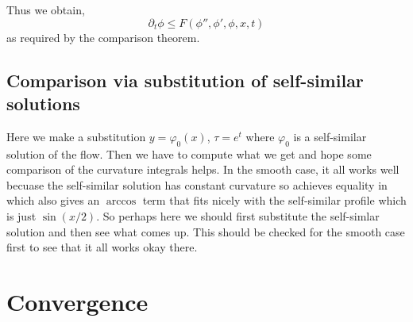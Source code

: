 \documentclass[11pt]{amsart}
\begin{document}
Thus we obtain,
\[
\partial_t \phi \leq F(\phi'', \phi', \phi, x, t)
\]
as required by the comparison theorem.

\subsection{Comparison via substitution of self-similar solutions}

Here we make a substitution $y = \varphi_0 (x)$, $\tau = e^t$ where $\varphi_0$ is a self-similar solution of the flow. Then we have to compute what we get and hope some comparison of the curvature integrals helps. In the smooth case, it all works well becuase the self-similar solution has constant curvature so achieves equality in \holder{} which also gives an $\arccos$ term that fits nicely with the self-similar profile which is just $\sin(x/2)$. So perhaps here we should first substitute the self-simlar solution and then see what comes up. This should be checked for the smooth case first to see that it all works okay there.

\section{Convergence}
\label{sec:orgheadline12}
\end{document}
